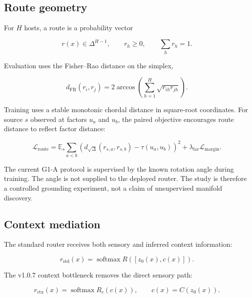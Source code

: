 \documentclass[11pt,a4paper]{article}
\newcommand{\E}{\mathbb{E}}
\newcommand{\loss}{\mathcal{L}}
\begin{document}
\subsection{Route geometry}

For $H$ hosts, a route is a probability vector

\begin{equation}
 r(x) \in \Delta^{H-1}, \qquad r_h\ge 0, \qquad \sum_h r_h=1.
\end{equation}

Evaluation uses the Fisher--Rao distance on the simplex,

\begin{equation}
 d_{\mathrm{FR}}(r_i,r_j)
 =2\arccos\left(\sum_{h=1}^{H}\sqrt{r_{ih}r_{jh}}\right).
\end{equation}

Training uses a stable monotonic chordal distance in square-root coordinates. For source $s$ observed at factors $u_a$ and $u_b$, the paired objective encourages route distance to reflect factor distance:

\begin{equation}
 \loss_{\mathrm{route}}
 = \E_s\sum_{a<b}
 \left(d_{\sqrt\Delta}(r_{s,a},r_{s,b})-\tau(u_a,u_b)\right)^2
 + \lambda_{\mathrm{far}}\loss_{\mathrm{margin}}.
\end{equation}

The current G1-A protocol is supervised by the known rotation angle during training. The angle is not supplied to the deployed router. The study is therefore a controlled grounding experiment, not a claim of unsupervised manifold discovery.

\subsection{Context mediation}

The standard router receives both sensory and inferred context information:

\begin{equation}
 r_{\mathrm{std}}(x)=\operatorname{softmax}R([z_0(x),c(x)]).
\end{equation}

The v1.0.7 context bottleneck removes the direct sensory path:

\begin{equation}
 r_{\mathrm{ctx}}(x)=\operatorname{softmax}R_c(c(x)),
 \qquad c(x)=C(z_0(x)).
\end{equation}
\end{document}
